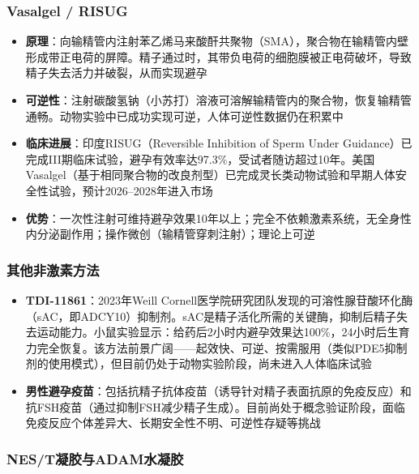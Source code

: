 \subsubsection{Vasalgel / RISUG}

\begin{itemize}[leftmargin=2cm]
	\item \textbf{原理}：向输精管内注射苯乙烯马来酸酐共聚物（SMA），聚合物在输精管内壁形成带正电荷的屏障。精子通过时，其带负电荷的细胞膜被正电荷破坏，导致精子失去活力并破裂，从而实现避孕
	\item \textbf{可逆性}：注射碳酸氢钠（小苏打）溶液可溶解输精管内的聚合物，恢复输精管通畅。动物实验中已成功实现可逆，人体可逆性数据仍在积累中
	\item \textbf{临床进展}：印度RISUG（Reversible Inhibition of Sperm Under Guidance）已完成III期临床试验，避孕有效率达97.3\%，受试者随访超过10年。美国Vasalgel（基于相同聚合物的改良剂型）已完成灵长类动物试验和早期人体安全性试验，预计2026--2028年进入市场
	\item \textbf{优势}：一次性注射可维持避孕效果10年以上；完全不依赖激素系统，无全身性内分泌副作用；操作微创（输精管穿刺注射）；理论上可逆
\end{itemize}

\subsubsection{其他非激素方法}

\begin{itemize}[leftmargin=2cm]
	\item \textbf{TDI-11861}：2023年Weill Cornell医学院研究团队发现的可溶性腺苷酸环化酶（sAC，即ADCY10）抑制剂。sAC是精子活化所需的关键酶，抑制后精子失去运动能力。小鼠实验显示：给药后2小时内避孕效果达100\%，24小时后生育力完全恢复。该方法前景广阔——起效快、可逆、按需服用（类似PDE5抑制剂的使用模式），但目前仍处于动物实验阶段，尚未进入人体临床试验
	\item \textbf{男性避孕疫苗}：包括抗精子抗体疫苗（诱导针对精子表面抗原的免疫反应）和抗FSH疫苗（通过抑制FSH减少精子生成）。目前尚处于概念验证阶段，面临免疫反应个体差异大、长期安全性不明、可逆性存疑等挑战
\end{itemize}

\subsubsection{NES/T凝胶与ADAM水凝胶}

